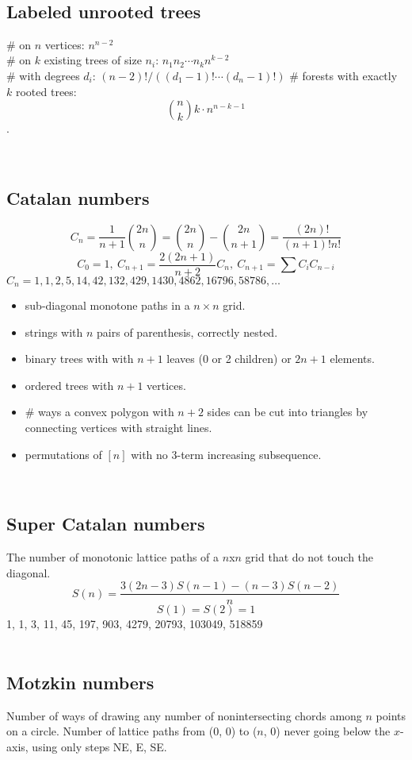 \

	\subsection{Labeled unrooted trees}
		\# on $n$ vertices: $n^{n-2}$ \\
		\# on $k$ existing trees of size $n_i$: $n_1n_2\cdots n_k n^{k-2}$\\
		\# with degrees $d_i$: $(n-2)! / ((d_1-1)! \cdots (d_n-1)!)$
		\# forests with exactly $k$ rooted trees: $$\binom{n}{k} k \cdot n^{n-k-1}$$.

\
    
	\subsection{Catalan numbers}
		\[ C_n=\frac{1}{n+1}\binom{2n}{n}= \binom{2n}{n}-\binom{2n}{n+1} = \frac{(2n)!}{(n+1)!n!} \]
		\[ C_0=1,\ C_{n+1} = \frac{2(2n+1)}{n+2}C_n,\ C_{n+1}=\sum C_iC_{n-i} \]
		${C_n = 1, 1, 2, 5, 14, 42, 132, 429, 1430, 4862, 16796, 58786, \dots}$
		\begin{itemize}[noitemsep]
			\item sub-diagonal monotone paths in a $n\times n$ grid.
			\item strings with $n$ pairs of parenthesis, correctly nested.
			\item binary trees with with $n+1$ leaves (0 or 2 children) or $2n + 1$ elements.
			\item ordered trees with $n+1$ vertices.
			\item \# ways a convex polygon with $n+2$ sides can be cut into triangles by connecting vertices with straight lines.
			\item permutations of $[n]$ with no 3-term increasing subsequence.
		\end{itemize}

\


    \subsection{Super Catalan numbers}
    The number of monotonic lattice paths of a $n$x$n$ grid that do not touch the diagonal.\\
    $$S(n) = \frac{3(2n-3)S(n-1)-(n-3)S(n-2)}{n}$$
    $$S(1) = S(2) = 1$$
    1, 1, 3, 11, 45, 197, 903, 4279, 20793, 103049, 518859\\


\


    \subsection{Motzkin numbers}
    Number of ways of drawing any number of nonintersecting chords among $n$ points on a circle. Number of lattice paths from (0, 0) to ($n$, 0) never going below the $x$-axis, using only steps NE, E, SE.\\
   
